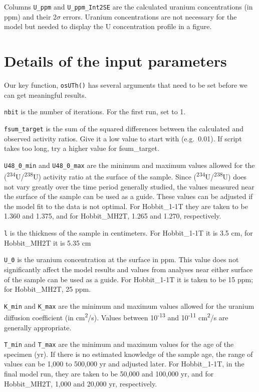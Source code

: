 \documentclass[]{elsarticle} %
\begin{document}
Columns \texttt{U\_ppm} and \texttt{U\_ppm\_Int2SE} are the calculated uranium concentrations (in ppm) and their 2\(\sigma\) errors. Uranium concentrations are not necessary for the model but needed to display the U concentration profile in a figure.

\hypertarget{details-of-the-input-parameters}{%
\section{Details of the input parameters}\label{details-of-the-input-parameters}}

Our key function, \texttt{osUTh()} has several arguments that need to be set before we can get meaningful results.

\texttt{nbit} is the number of iterations. For the first run, set to 1.

\texttt{fsum\_target} is the sum of the squared differences between the calculated and observed activity ratios. Give it a low value to start with (e.g.~0.01). If script takes too long, try a higher value for fsum\_target.

\texttt{U48\_0\_min} and \texttt{U48\_0\_max} are the minimum and maximum values allowed for the (\textsuperscript{234}U/\textsuperscript{238}U) activity ratio at the surface of the sample. Since (\textsuperscript{234}U/\textsuperscript{238}U) does not vary greatly over the time period generally studied, the values measured near the surface of the sample can be used as a guide. These values can be adjusted if the model fit to the data is not optimal. For Hobbit\_1-1T they are taken to be 1.360 and 1.375, and for Hobbit\_MH2T, 1.265 and 1.270, respectively.

\texttt{l} is the thickness of the sample in centimeters. For Hobbit\_1-1T it is 3.5 cm, for Hobbit\_MH2T it is 5.35 cm

\texttt{U\_0} is the uranium concentration at the surface in ppm. This value does not significantly affect the model results and values from analyses near either surface of the sample can be used as a guide. For Hobbit\_1-1T it is taken to be 15 ppm; for Hobbit\_MH2T, 25 ppm.

\texttt{K\_min} and \texttt{K\_max} are the minimum and maximum values allowed for the uranium diffusion coefficient (in cm\textsuperscript{2}/s). Values between 10\textsuperscript{-13} and 10\textsuperscript{-11} cm\textsuperscript{2}/s are generally appropriate.

\texttt{T\_min} and \texttt{T\_max} are the minimum and maximum values for the age of the specimen (yr). If there is no estimated knowledge of the sample age, the range of values can be 1,000 to 500,000 yr and adjusted later. For Hobbit\_1-1T, in the final model run, they are taken to be 50,000 and 100,000 yr, and for Hobbit\_MH2T, 1,000 and 20,000 yr, respectively.
\end{document}

